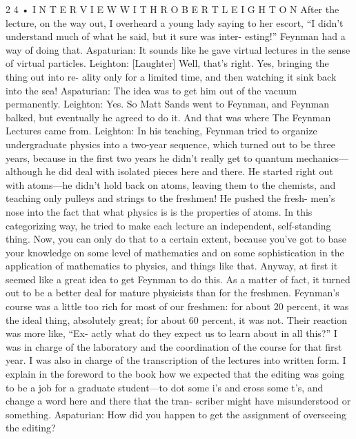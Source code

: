 \documentclass[11pt,oneside]{article}
\begin{document}
2 4 • I N T E R V I E W  W I T H  R O B E R T  L E I G H T O N After the lecture, on the way out, I overheard a young lady saying to her escort, “I didn’t understand much of what he said, but it sure was inter- esting!” Feynman had a way of doing that. Aspaturian: It sounds like he gave virtual lectures in the sense of virtual particles. Leighton: [Laughter] Well, that’s right. Yes, bringing the thing out into re- ality only for a limited time, and then watching it sink back into the sea! Aspaturian: The idea was to get him out of the vacuum permanently. Leighton: Yes. So Matt Sands went to Feynman, and Feynman balked, but eventually he agreed to do it. And that was where The Feynman Lectures came from. Leighton: In his teaching, Feynman tried to organize undergraduate physics into a two-year sequence, which turned out to be three years, because in the first two years he didn’t really get to quantum mechanics---although he did deal with isolated pieces here and there. He started right out with atoms---he didn’t hold back on atoms, leaving them to the chemists, and teaching only pulleys and strings to the freshmen! He pushed the fresh- men’s nose into the fact that what physics is is the properties of atoms. In this categorizing way, he tried to make each lecture an independent, self-standing thing. Now, you can only do that to a certain extent, because you’ve got to base your knowledge on some level of mathematics and on some sophistication in the application of mathematics to physics, and things like that. Anyway, at first it seemed like a great idea to get Feynman to do this. As a matter of fact, it turned out to be a better deal for mature physicists than for the freshmen. Feynman’s course was a little too rich for most of our freshmen: for about 20 percent, it was the ideal thing, absolutely great; for about 60 percent, it was not. Their reaction was more like, “Ex- actly what do they expect us to learn about in all this?” I was in charge of the laboratory and the coordination of the course for that first year. I was also in charge of the transcription of the lectures into written form. I explain in the foreword to the book how we expected that the editing was going to be a job for a graduate student---to dot some i’s and cross some t’s, and change a word here and there that the tran- scriber might have misunderstood or something. Aspaturian: How did you happen to get the assignment of overseeing the editing?\par
\end{document}
